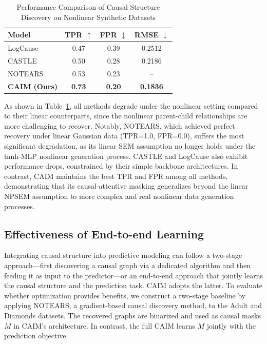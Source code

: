\documentclass[sigconf, nonacm]{acmart}
\newcommand{\syadd}[1]{{\color{black}#1}}
\newcommand{\syfix}[1]{{\color{black}#1}}
\newcommand{\syne}[1]{{\color{black}#1}}
\newcommand*{\ourmodel}{CAIM}
\begin{document}
\syadd{
\begin{table}[h]
  \caption{Performance Comparison of Causal Structure Discovery on Nonlinear Synthetic Datasets}
  \label{tab:nonlinear}
  \centering
  \small
  \setlength{\tabcolsep}{4pt}
  \begin{tabular}{l ccc}
    \toprule
    Model & TPR $\uparrow$ & FPR $\downarrow$ & RMSE $\downarrow$ \\
    \midrule
     LogCause   & 0.47 & 0.39 & 0.2512 \\
     CASTLE     & \syne{0.50} & 0.28 & 0.2186 \\
     NOTEARS   & 0.53 & 0.23 & -- \\
     \textbf{\ourmodel{} (Ours)} & \textbf{0.73} & \textbf{0.20} & \textbf{0.1836} \\
    \bottomrule
  \end{tabular}
\end{table}
}

\syfix{As shown in Table~\ref{tab:nonlinear}, all methods degrade under the nonlinear setting compared to their linear counterparts, since the nonlinear parent-child relationships are more challenging to recover. Notably, NOTEARS, which achieved perfect recovery under linear Gaussian data (TPR=1.0, FPR=0.0), suffers the most significant degradation, as its linear SEM assumption no longer holds under the tanh-MLP nonlinear generation process. CASTLE and LogCause also exhibit performance drops, constrained by their simple backbone architectures. In contrast, \ourmodel{} maintains the best TPR and FPR among all methods, demonstrating that its causal-attentive masking generalizes beyond the linear NPSEM assumption to more complex and real nonlinear data generation processes.}


\subsection{Effectiveness of End-to-end Learning}\label{sec:end_to_end}
Integrating causal structure into predictive modeling \syne{can follow} a two-stage approach---first discovering a causal graph via a dedicated algorithm and then feeding it as input to the predictor---or an end-to-end approach that jointly learns the causal structure and the prediction task. \ourmodel{} adopts the latter. To evaluate whether optimization provides benefits, we construct a two-stage baseline by applying NOTEARS\cite{notears}, a gradient-based causal discovery method, to the Adult and Diamonds datasets. The recovered graphs are binarized and used as causal masks $M$ in \ourmodel{}'s architecture. 
In contrast, the full \ourmodel{} learns $M$ jointly with the prediction objective.
\end{document}
